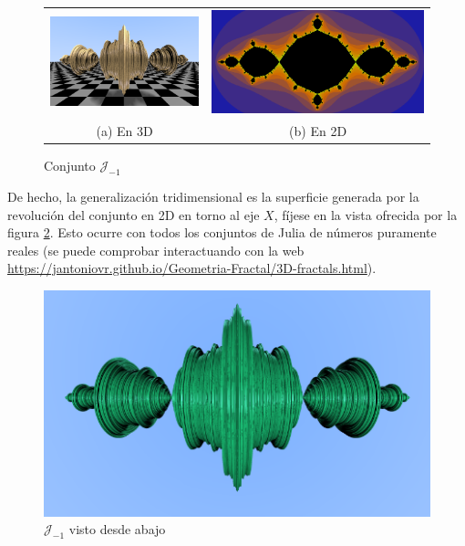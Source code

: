 \begin{figure}[ht]
    \centering
    \begin{tabular}{cc}
        \includegraphics[scale=0.37]{img/C8/julia-3D-frontal-1.png} &
      \includegraphics[scale=0.31]{img/C8/julia-2D-1.png} \\    
    (a) En 3D & (b) En 2D  \\
    \end{tabular}
    \caption{Conjunto $\mathcal{J}_{-1}$}
    \label{fig:julia-3D-2D}
\end{figure}

De hecho, la generalización tridimensional es la superficie generada por la revolución del conjunto en 2D en torno al eje $X$, fíjese en la vista ofrecida por la figura \ref{fig:julia-3D-abajo-1}. Esto ocurre con todos los conjuntos de Julia de números puramente reales (se puede comprobar interactuando con la web \url{https://jantoniovr.github.io/Geometria-Fractal/3D-fractals.html}).

\begin{figure} [ht]
    \centering
    \includegraphics[scale = 0.5]{img/C8/julia-3D-abajo-1.png}
    \caption{$\mathcal{J}_{-1}$ visto desde abajo}
    \label{fig:julia-3D-abajo-1}
\end{figure}

